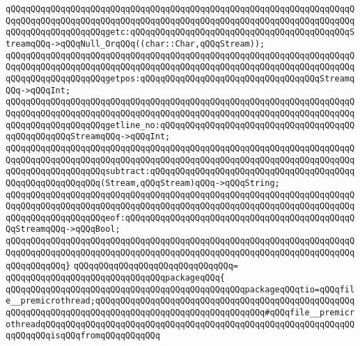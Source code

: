 \newline
\verb|qQQqqQQqqQQqqQQqqQQqqQQqqQQqqQQqqQQqqQQqqQQqqQQqqQQqqQQqqQQqqQQqqQQqqQQqqQQqqQQqqQQqqQQqqQQqqQQqqQQqqQQqqQQqqQQqqQQqqQQqqQQqqQQqqQQqqQQqqQQqqQQqqQQqqQQqqQQqqQQqgetc:qQQqqQQqqQQqqQQqqQQqqQQqqQQqqQQqqQQqqQQqqQQqStreamqQQq->qQQqNull_OrqQQq((char::Char,qQQqStream));|\newline
\verb|qQQqqQQqqQQqqQQqqQQqqQQqqQQqqQQqqQQqqQQqqQQqqQQqqQQqqQQqqQQqqQQqqQQqqQQqqQQqqQQqqQQqqQQqqQQqqQQqqQQqqQQqqQQqqQQqqQQqqQQqqQQqqQQqqQQqqQQqqQQqqQQqqQQqqQQqqQQqqQQqgetpos:qQQqqQQqqQQqqQQqqQQqqQQqqQQqqQQqqQQqStreamqQQq->qQQqInt;|\newline
\newline
\verb|qQQqqQQqqQQqqQQqqQQqqQQqqQQqqQQqqQQqqQQqqQQqqQQqqQQqqQQqqQQqqQQqqQQqqQQqqQQqqQQqqQQqqQQqqQQqqQQqqQQqqQQqqQQqqQQqqQQqqQQqqQQqqQQqqQQqqQQqqQQqqQQqqQQqqQQqqQQqqQQqgetline_no:qQQqqQQqqQQqqQQqqQQqqQQqqQQqqQQqqQQqqQQqqQQqqQQqqQQqStreamqQQq->qQQqInt;|\newline
\verb|qQQqqQQqqQQqqQQqqQQqqQQqqQQqqQQqqQQqqQQqqQQqqQQqqQQqqQQqqQQqqQQqqQQqqQQqqQQqqQQqqQQqqQQqqQQqqQQqqQQqqQQqqQQqqQQqqQQqqQQqqQQqqQQqqQQqqQQqqQQqqQQqqQQqqQQqqQQqqQQqsubtract:qQQqqQQqqQQqqQQqqQQqqQQqqQQqqQQqqQQqqQQqqQQqqQQqqQQqqQQqqQQq(Stream,qQQqStream)qQQq->qQQqString;|\newline
\newline
\verb|qQQqqQQqqQQqqQQqqQQqqQQqqQQqqQQqqQQqqQQqqQQqqQQqqQQqqQQqqQQqqQQqqQQqqQQqqQQqqQQqqQQqqQQqqQQqqQQqqQQqqQQqqQQqqQQqqQQqqQQqqQQqqQQqqQQqqQQqqQQqqQQqqQQqqQQqqQQqqQQqeof:qQQqqQQqqQQqqQQqqQQqqQQqqQQqqQQqqQQqqQQqqQQqqQQqStreamqQQq->qQQqBool;|\newline
\verb|qQQqqQQqqQQqqQQqqQQqqQQqqQQqqQQqqQQqqQQqqQQqqQQqqQQqqQQqqQQqqQQqqQQqqQQqqQQqqQQqqQQqqQQqqQQqqQQqqQQqqQQqqQQqqQQqqQQqqQQqqQQqqQQqqQQqqQQqqQQqqQQqqQQqqQQq}|\newline
\verb|qQQqqQQqqQQqqQQqqQQqqQQqqQQqqQQq=|\newline
\verb|qQQqqQQqqQQqqQQqqQQqqQQqqQQqqQQqpackageqQQq{|\newline
\newline
\verb|qQQqqQQqqQQqqQQqqQQqqQQqqQQqqQQqqQQqqQQqqQQqqQQqpackageqQQqtio=qQQqfile__premicrothread;qQQqqQQqqQQqqQQqqQQqqQQqqQQqqQQqqQQqqQQqqQQqqQQqqQQqqQQqqQQqqQQqqQQqqQQqqQQqqQQqqQQqqQQqqQQqqQQqqQQqqQQq#qQQqfile__premicrothreadqQQqqQQqqQQqqQQqqQQqqQQqqQQqqQQqqQQqqQQqqQQqqQQqqQQqqQQqqQQqqQQqqQQqqQQqisqQQqfromqQQqqQQqqQQq|\newline
\newline
